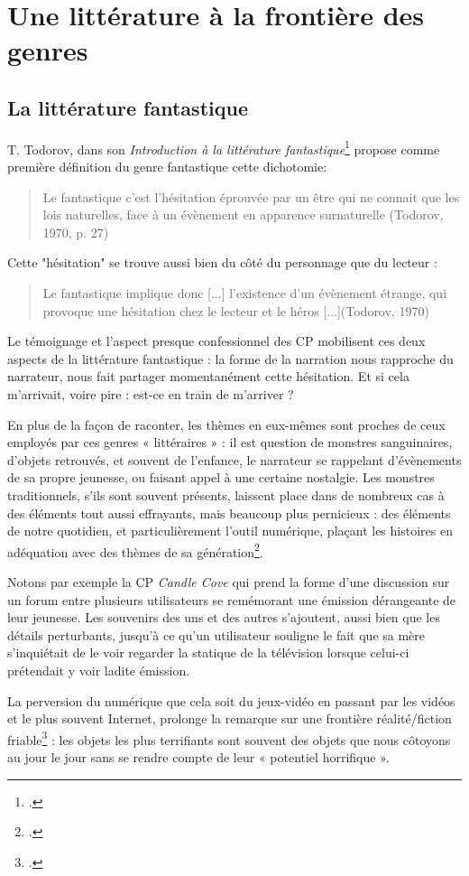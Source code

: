 \documentclass[12pt,a4paper,oneside,titlepage]{book} %
\begin{document}
\section{Une littérature à la frontière des genres}
\subsection{La littérature fantastique}

T. Todorov, dans son \emph{Introduction à la littérature fantastique}\footcite{todorov_introduction_1992} propose comme première définition du genre fantastique cette dichotomie: 

	\begin{quotation}
Le fantastique c’est l’hésitation éprouvée par un être qui ne connait que les lois naturelles, face à un évènement en apparence surnaturelle (Todorov, 1970, p. 27)\newline
	\end{quotation}

Cette "hésitation" se trouve aussi bien du côté du personnage que du lecteur : 
\begin{quotation}
	Le fantastique implique donc [...] l’existence d’un évènement étrange, qui provoque une hésitation chez le lecteur et le héros [...](Todorov, 1970)
\end{quotation}

Le témoignage et l'aspect presque confessionnel des CP mobilisent ces deux aspects de la littérature fantastique : la forme de la narration nous rapproche du narrateur, nous fait partager momentanément cette hésitation. Et si cela m'arrivait, voire pire : est-ce en train de m'arriver ? 

\par
En plus de la façon de raconter, les thèmes en eux-mêmes sont proches de ceux employés par ces genres « littéraires » : il est question de monstres sanguinaires, d’objets retrouvés, et souvent de l’enfance, le narrateur se rappelant d’évènements de sa propre jeunesse, ou faisant appel à une certaine nostalgie. Les monstres traditionnels, s’ils sont souvent présents, laissent place dans de nombreux cas à des éléments tout aussi effrayants, mais beaucoup plus pernicieux : des éléments de notre quotidien, et particulièrement l’outil numérique, plaçant les histoires en adéquation avec des thèmes de sa génération\footcite{king_anatomie_2020}.
\par
Notons par exemple la CP \emph{Candle Cove} qui prend la forme d’une discussion sur un forum entre plusieurs utilisateurs se remémorant une émission dérangeante de leur jeunesse. Les souvenirs des uns et des autres s’ajoutent, aussi bien que les détails perturbants, jusqu’à ce qu’un utilisateur souligne le fait que sa mère s’inquiétait de le voir regarder la statique de la télévision lorsque celui-ci prétendait y voir ladite émission. 
\par
La perversion du numérique que cela soit du jeux-vidéo en passant par les vidéos et le plus souvent Internet, prolonge la remarque sur une frontière réalité/fiction friable\footcite{balanzategui_creepypasta_2019} : les objets les plus terrifiants sont souvent des objets que nous côtoyons au jour le jour sans se rendre compte de leur « potentiel horrifique ».
\par
\end{document}
